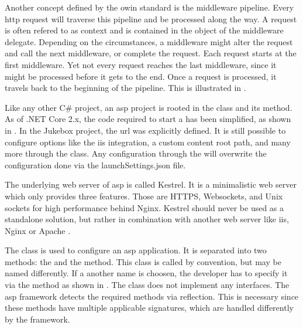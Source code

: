 Another concept defined by the \gls{owin} standard is the middleware pipeline. Every \gls{http} request will traverse this pipeline and be processed along the way. A request is often refered to as context and is contained in the  object of the middleware delegate. Depending on the circumstances, a middleware might alter the request and call the next middleware, or complete the request. Each request starts at the first middleware. Yet not every request reaches the last middleware, since it might be processed before it gets to the end. Once a request is processed, it travels back to the beginning of the pipeline. This is illustrated in .



Like any other C\# project, an \gls{asp} project is rooted in the  class and its  method. As of .NET Core 2.x, the code required to start a  has been simplified, as shown in  \cite{aspFundamentals}. In the Jukebox project, the \gls{url} was explicitly defined. It is still possible to configure options like the \gls{iis} integration, a custom content root path, and many more through the  class. Any configuration through the  will overwrite the configuration done via the launchSettings.json file.


The underlying web server of \gls{asp} is called Kestrel. It is a minimalistic web server which only provides three features. Those are HTTPS, Websockets, and Unix sockets for high performance behind Nginx. Kestrel should never be used as a standalone solution, but rather in combination with another web server like \gls{iis}, Nginx or Apache \cite{kestrel}.


The  class is used to configure an \gls{asp} application. It is separated into two methods: the  and the  method. This class is called  by convention, but may be named differently. If a another name is choosen, the developer has to specify it via the  method as shown in . The  class does not implement any interfaces. The \gls{asp} framework detects the required methods via reflection. This is necessary since these methods have multiple applicable signatures, which are handled differently by the framework.

